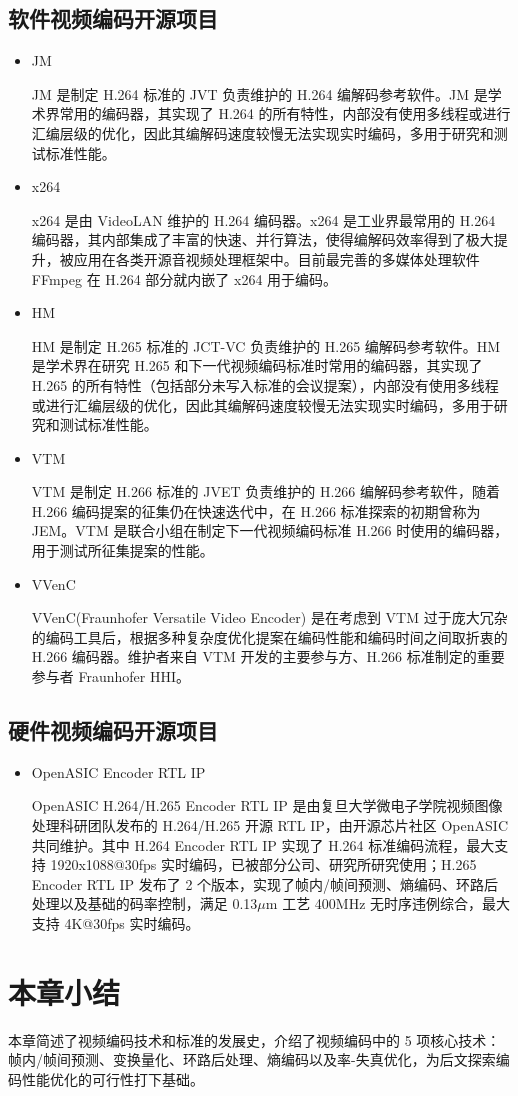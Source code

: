 \subsection{软件视频编码开源项目}
\begin{itemize}
    \item JM

          JM 是制定 H.264 标准的 JVT 负责维护的 H.264 编解码参考软件。JM 是学术界常用的编码器，其实现了 H.264 的所有特性，内部没有使用多线程或进行汇编层级的优化，因此其编解码速度较慢无法实现实时编码，多用于研究和测试标准性能。

    \item x264

          x264 是由 VideoLAN 维护的 H.264 编码器。x264 是工业界最常用的 H.264 编码器，其内部集成了丰富的快速、并行算法，使得编解码效率得到了极大提升，被应用在各类开源音视频处理框架中。目前最完善的多媒体处理软件 FFmpeg 在 H.264 部分就内嵌了 x264 用于编码。

    \item HM

          HM 是制定 H.265 标准的 JCT-VC 负责维护的 H.265 编解码参考软件。HM 是学术界在研究 H.265 和下一代视频编码标准时常用的编码器，其实现了 H.265 的所有特性（包括部分未写入标准的会议提案），内部没有使用多线程或进行汇编层级的优化，因此其编解码速度较慢无法实现实时编码，多用于研究和测试标准性能。

    \item VTM

          VTM 是制定 H.266 标准的 JVET 负责维护的 H.266 编解码参考软件，随着 H.266 编码提案的征集仍在快速迭代中，在 H.266 标准探索的初期曾称为 JEM。VTM 是联合小组在制定下一代视频编码标准 H.266 时使用的编码器，用于测试所征集提案的性能。

    \item VVenC

          VVenC(Fraunhofer Versatile Video Encoder) 是在考虑到 VTM 过于庞大冗杂的编码工具后，根据多种复杂度优化提案在编码性能和编码时间之间取折衷的 H.266 编码器。维护者来自 VTM 开发的主要参与方、H.266 标准制定的重要参与者 Fraunhofer HHI。
\end{itemize}

\subsection{硬件视频编码开源项目}
\begin{itemize}
    \item OpenASIC Encoder RTL IP

          OpenASIC H.264/H.265 Encoder RTL IP 是由复旦大学微电子学院视频图像处理科研团队发布的 H.264/H.265 开源 RTL IP，由开源芯片社区 OpenASIC 共同维护。其中 H.264 Encoder RTL IP 实现了 H.264 标准编码流程，最大支持 1920x1088@30fps 实时编码，已被部分公司、研究所研究使用；H.265 Encoder RTL IP 发布了 2 个版本，实现了帧内/帧间预测、熵编码、环路后处理以及基础的码率控制，满足 0.13$\mu$m 工艺 400MHz 无时序违例综合，最大支持 4K@30fps 实时编码。
\end{itemize}

\section{本章小结}
本章简述了视频编码技术和标准的发展史，介绍了视频编码中的 5 项核心技术：帧内/帧间预测、变换量化、环路后处理、熵编码以及率-失真优化，为后文探索编码性能优化的可行性打下基础。